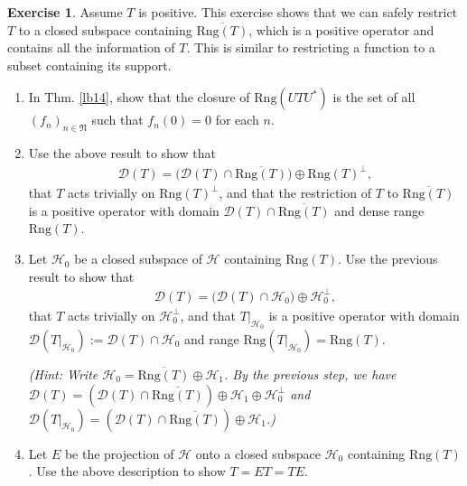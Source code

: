 \documentclass[12pt,b5paper,notitlepage]{article}
\theoremstyle{definition}
\newtheorem{exe}[df]{Exercise}
\theoremstyle{plain}
\newcommand{\fk}{\mathfrak}
\newcommand{\mc}{\mathcal}
\newcommand{\ovl}{\overline}
\newcommand{\Dom}{\scr D}
\newcommand{\scr}{\mathscr}
\newcommand{\Rng}{\mathrm{Rng}}
\numberwithin{equation}{section}
\begin{document}
\begin{exe}\label{lb15}
Assume $T$ is positive. This exercise shows that we can safely restrict $T$ to a closed subspace containing $\ovl{\Rng(T)}$, which is a positive operator and contains all the information of $T$. This is similar to restricting a function to a subset containing its support.
\begin{enumerate}
\item In Thm. \ref{lb14}, show that the closure of $\Rng(UTU^*)$ is the set of all $(f_n)_{n\in\fk N}$ such that $f_n(0)=0$ for each $n$.
\item Use the above result to show that 
\begin{align*}
\Dom(T)=\big(\Dom(T)\cap\ovl{\Rng(T)}\big)\oplus \Rng(T)^\perp,	
\end{align*}
that $T$ acts trivially on $\Rng(T)^\perp$, and that the restriction of  $T$ to $\ovl{\Rng(T)}$ is a positive operator with domain $\Dom(T)\cap\ovl{\Rng(T)}$ and dense range $\Rng(T)$.
\item Let $\mc H_0$ be a closed subspace of $\mc H$ containing $\Rng(T)$. Use the previous result to show that
\begin{align*}
\Dom(T)=\big(\Dom(T)\cap \mc H_0\big)\oplus\mc H_0^\perp,	
\end{align*}
that $T$ acts trivially on $\mc H_0^\perp$, and that $T|_{\mc H_0}$ is a positive operator with domain $\Dom(T|_{\mc H_0}):=\Dom(T)\cap \mc H_0$ and range $\Rng(T|_{\mc H_0})=\Rng(T)$.

\textit{(Hint: Write $\mc H_0=\ovl{\Rng(T)}\oplus\mc H_1$. By the previous step, we have  $\Dom(T)=(\Dom(T)\cap\ovl{\Rng(T)})\oplus\mc H_1\oplus\mc H_0^\perp$ and $\Dom(T|_{\mc H_0})=(\Dom(T)\cap\ovl{\Rng(T)})\oplus\mc H_1$.)}
\item  Let $E$ be the projection of $\mc H$ onto a closed subspace $\mc H_0$ containing $\Rng(T)$. Use the above description to show $T=ET=TE$.
\end{enumerate}

\end{exe}
\end{document}
